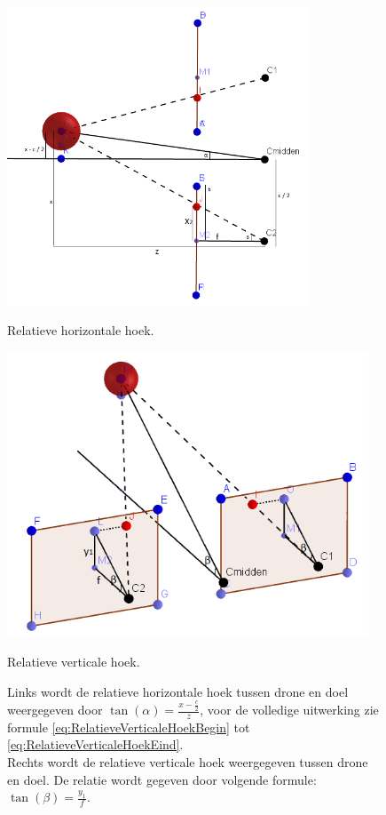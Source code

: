 \begin{figure}
	\centering
	\begin{minipage}{.45\textwidth}
		\centering
		\includegraphics[width=0.8\textwidth]{RelatieveHorizontaleHoek.png}
		\caption{Relatieve horizontale hoek.}
		\label{fig:RelatieveHorizontaleHoek}
	\end{minipage}
	\begin{minipage}{.45\textwidth}
		\centering
		\includegraphics[width=0.96\textwidth]{RelatieveVerticaleHoek.png}
		\caption{Relatieve verticale hoek.}
		\label{fig:RelatieveVerticaleHoek}
	\end{minipage}%
	\caption*{Links wordt de relatieve horizontale hoek tussen drone en doel weergegeven door \(\tan(\alpha) = \frac{x-\frac{c}{2}}{z}\), voor de volledige uitwerking zie formule \ref{eq:RelatieveVerticaleHoekBegin} tot \ref{eq:RelatieveVerticaleHoekEind}.\\
		Rechts wordt de relatieve verticale hoek weergegeven tussen drone en doel. De relatie wordt gegeven door volgende formule: \(\tan(\beta) = \frac{y_1}{f}\).}
\end{figure}

